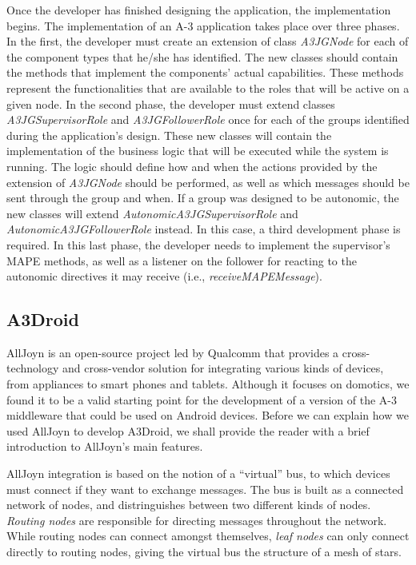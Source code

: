 Once the developer has finished designing the application, the implementation begins. The implementation of an A-3 application takes place over three phases. In the first, the developer must create an extension of class \emph{A3JGNode} for each of the component types that he/she has identified. The new classes should contain the methods that implement the components' actual capabilities. These methods represent the functionalities that are available to the roles that will be active on a given node. In the second phase, the developer must extend classes \emph{A3JGSupervisorRole} and \emph{A3JGFollowerRole} once for each of the groups identified during the application's design. These new classes will contain the implementation of the business logic that will be executed while the system is running. The logic should define how and when the actions provided by the extension of \emph{A3JGNode} should be performed, as well as which messages should be sent through the group and when. If a group was designed to be autonomic, the new classes will extend \emph{AutonomicA3JGSupervisorRole} and \emph{AutonomicA3JGFollowerRole} instead. In this case, a third development phase is required. In this last phase, the developer needs to implement the supervisor's MAPE methods, as well as a listener on the follower for reacting to the autonomic directives it may receive (i.e., \emph{receiveMAPEMessage}). 

\subsection{A3Droid} %
\label{sub:a3droid}

AllJoyn is an open-source project led by Qualcomm that provides a cross-technology and cross-vendor solution for integrating various kinds of devices, from appliances to smart phones and tablets. Although it focuses on domotics, we found it to be a valid starting point for the development of a version of the A-3 middleware that could be used on Android devices. Before we can explain how we used AllJoyn to develop A3Droid, we shall provide the reader with a brief introduction to AllJoyn's main features.

AllJoyn integration is based on the notion of a ``virtual'' bus, to which devices must connect if they want to exchange messages. The bus is built as a connected network of nodes, and distringuishes between two different kinds of nodes. \emph{Routing nodes} are responsible for directing messages throughout the network. While routing nodes can connect amongst themselves, \emph{leaf nodes} can only connect directly to routing nodes, giving the virtual bus the structure of a mesh of stars. 

